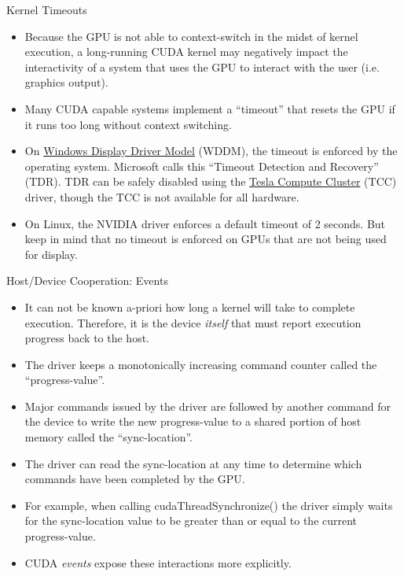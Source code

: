 \documentclass[handout]{beamer}
\begin{document}
\begin{frame}{Kernel Timeouts}
\begin{itemize}
	\item<1->Because the GPU is not able to context-switch in the midst of kernel execution, a long-running CUDA kernel may negatively impact the interactivity of a system that uses the GPU to interact with the user (i.e. graphics output).
	\item<1->Many CUDA capable systems implement a ``timeout'' that resets the GPU if it runs too long without context switching.
	\item<1->On \href{https://en.wikipedia.org/wiki/Windows_Display_Driver_Model}{\color{blue}Windows Display Driver Model} (WDDM), the timeout is enforced by the operating system.  Microsoft calls this ``Timeout Detection and Recovery'' (TDR).  TDR can be safely disabled using the \href{http://http.developer.nvidia.com/ParallelNsight/2.1/Documentation/UserGuide/HTML/Content/Tesla_Compute_Cluster.htm}{\color{blue}Tesla Compute Cluster} (TCC) driver, though the TCC is not available for all hardware.  
	\item<1->On Linux, the NVIDIA driver enforces a default timeout of 2 seconds.  But keep in mind that no timeout is enforced on GPUs that are not being used for display.  
\end{itemize}
\end{frame}

\begin{frame}{Host/Device Cooperation: Events}
\begin{itemize}
    \item<1->It can not be known a-priori how long a kernel will take to complete execution.  Therefore, it is the device \emph{itself} that must report execution progress back to the host. 
    \item<1->The driver keeps a monotonically increasing command counter called the ``progress-value''. 
    \item<1->Major commands issued by the driver are followed by another command for the device to write the new progress-value to a shared portion of host memory called the ``sync-location''.
    \item<1->The driver can read the sync-location at any time to determine which commands have been completed by the GPU. 
    \item<1->For example, when calling {\selectfont cudaThreadSynchronize()} the driver simply waits for the sync-location value to be greater than or equal to the current progress-value.
    \item<1->CUDA \emph{events} expose these interactions more explicitly.
\end{itemize}
\end{frame}
\end{document}
